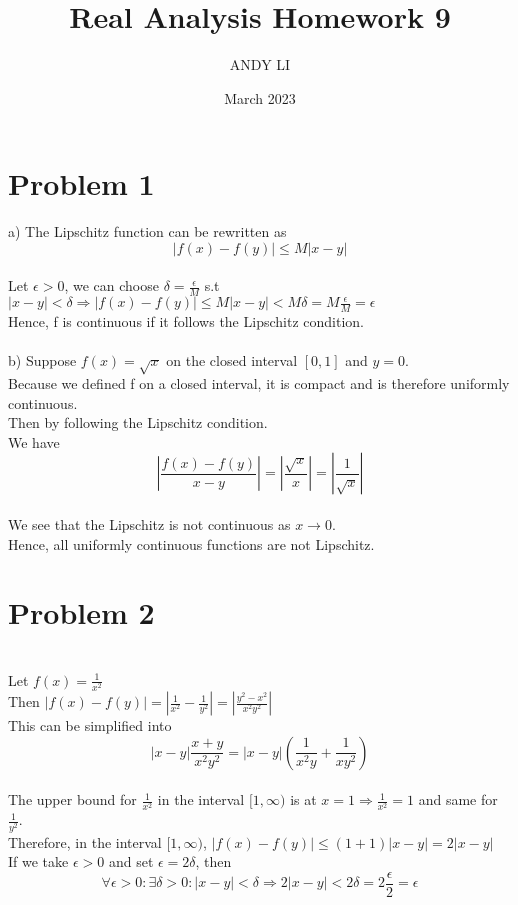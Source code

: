 \documentclass{article}
\title{Real Analysis Homework 9}
\author{ANDY LI}
\date{March 2023}
\begin{document}
\maketitle
\section*{Problem 1}
a) The Lipschitz function can be rewritten as $$|f(x) - f(y)| \leq M|x - y|$$
\\Let $\epsilon > 0$, we can choose $\delta = \frac{\epsilon}{M}$ s.t $|x - y| < \delta \Rightarrow |f(x)-f(y)| \leq M|x - y| < M\delta = M\frac{\epsilon}{M} = \epsilon$
\\Hence, f is continuous if it follows the Lipschitz condition.
\\
\\b) Suppose $f(x) = \sqrt{x}$ on the closed interval $[0, 1]$ and $y = 0$.
\\Because we defined f on a closed interval, it is compact and is therefore uniformly continuous.
\\Then by following the Lipschitz condition.
\\We have $$|\frac{f(x) - f(y)}{x-y}| = |\frac{\sqrt{x}}{x}| = |\frac{1}{\sqrt{x}}|$$
\\We see that the Lipschitz is not continuous as $x \to 0$.
\\Hence, all uniformly continuous functions are not Lipschitz.

\section*{Problem 2}
\\Let $f(x) = \frac{1}{x^2}$
\\Then $|f(x) - f(y)| = |\frac{1}{x^2} - \frac{1}{y^2}| = |\frac{y^2 - x^2}{x^2y^2}|$
\\This can be simplified into $$|x - y|\frac{x + y}{x^2y^2} = |x - y|(\frac{1}{x^2y} + \frac{1}{xy^2})$$
\\The upper bound for $\frac{1}{x^2}$ in the interval $[1, \infty)$ is at $x = 1 \Rightarrow \frac{1}{x^2} = 1$ and same for $\frac{1}{y^2}$.
\\Therefore, in the interval $[1, \infty)$, $|f(x) - f(y)| \leq (1+1)|x - y| = 2|x - y|$
\\If we take $\epsilon > 0$ and set $\epsilon = 2\delta$, then $$\forall \epsilon > 0 : \exists \delta > 0 : |x - y| < \delta \Rightarrow 2|x - y| < 2\delta = 2\frac{\epsilon}{2} = \epsilon$$
\end{document}
